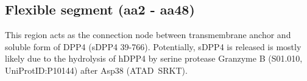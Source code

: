 \subsection{Flexible segment (aa2 - aa48)}

This region acts as the connection node between transmembrane anchor and soluble form of DPP4 (sDPP4 39-766). Potentially, sDPP4 is released is mostly likely due to the hydrolysis of hDPP4 by serine protease Granzyme B (S01.010, UniProtID:P10144) after Asp38 (ATAD~\textbar SRKT).~\cite{Song_2018} 
